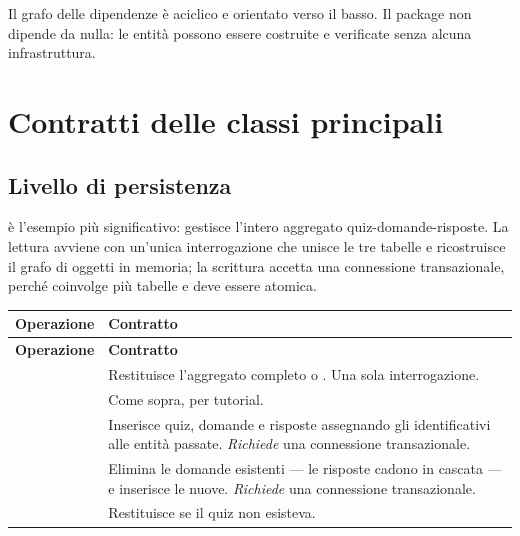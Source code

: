 Il grafo delle dipendenze è aciclico e orientato verso il basso. Il package
 non dipende da nulla: le entità possono essere costruite e
verificate senza alcuna infrastruttura.

\section{Contratti delle classi principali}

\subsection{Livello di persistenza}


 è l'esempio più significativo: gestisce l'intero aggregato
quiz-domande-risposte. La lettura avviene con un'unica interrogazione che
unisce le tre tabelle e ricostruisce il grafo di oggetti in memoria; la
scrittura accetta una connessione transazionale, perché coinvolge più
tabelle e deve essere atomica.

\begin{longtable}{@{}L{5.6cm} L{8.8cm}@{}}
\toprule
\textbf{Operazione} & \textbf{Contratto} \\
\midrule
\endfirsthead
\toprule
\textbf{Operazione} & \textbf{Contratto} \\
\midrule
\endhead
\bottomrule
\endlastfoot

 &
Restituisce l'aggregato completo o . Una sola interrogazione. \\

 & Come sopra, per tutorial. \\

 &
Inserisce quiz, domande e risposte assegnando gli identificativi alle entità
passate. \emph{Richiede} una connessione transazionale. \\

 &
Elimina le domande esistenti — le risposte cadono in cascata — e inserisce
le nuove. \emph{Richiede} una connessione transazionale. \\

 &
Restituisce  se il quiz non esisteva. \\

\end{longtable}


